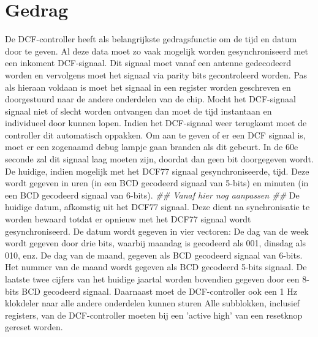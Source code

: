 \section{Gedrag}
De DCF-controller heeft als belangrijkste gedragsfunctie om de tijd en datum door te geven. Al deze data moet zo vaak mogelijk worden gesynchroniseerd met een inkoment DCF-signaal. Dit signaal moet vanaf een antenne gedecodeerd worden en vervolgens moet het signaal via parity bits gecontroleerd worden. Pas als hieraan voldaan is moet het signaal in een register worden geschreven en doorgestuurd naar de andere onderdelen van de chip. Mocht het DCF-signaal signaal niet of slecht worden ontvangen dan moet de tijd instantaan en individueel door kunnen lopen. Indien het DCF-signaal weer terugkomt moet de controller dit automatisch oppakken. Om aan te geven of er een  DCF signaal is, moet er een zogenaamd debug lampje gaan branden als dit gebeurt. In de 60e seconde zal dit signaal laag moeten zijn, doordat dan geen bit doorgegeven wordt. \\
 De huidige, indien mogelijk met het DCF77 signaal gesynchroniseerde, tijd. Deze wordt gegeven in uren (in een BCD gecodeerd signaal van 5-bits) en minuten (in een BCD gecodeerd signaal van 6-bits).
\emph{\color{red} \#\# Vanaf hier nog aanpassen \#\#}
De huidige datum, afkomstig uit het DCF77 signaal. Deze dient na synchronisatie te worden bewaard totdat er opnieuw met het DCF77 signaal wordt gesynchroniseerd. De datum wordt gegeven in vier vectoren:
De dag van de week wordt gegeven door drie bits, waarbij maandag is gecodeerd als 001, dinsdag als 010, enz.
De dag van de maand, gegeven als BCD gecodeerd signaal van 6-bits.
Het nummer van de maand wordt gegeven als BCD gecodeerd 5-bits signaal.
De laatste twee cijfers van het huidige jaartal worden bovendien gegeven door een 8-bits BCD gecodeerd signaal.
Daarnaast moet de DCF-controller ook een 1 Hz klokdeler naar alle andere onderdelen kunnen sturen
Alle subblokken, inclusief registers, van de DCF-controller moeten bij een 'active high' van een resetknop gereset worden.